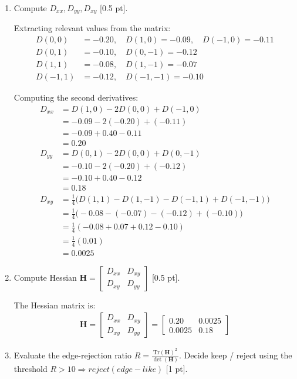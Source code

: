 \documentclass[12pt,a4paper]{article}
\begin{document}
\begin{enumerate}
    \item Compute $D_{xx}, D_{yy}, D_{xy}$ [0.5 pt].

    Extracting relevant values from the matrix:
    \begin{align*}
    D(0,0) &= -0.20, \quad D(1,0) = -0.09, \quad D(-1,0) = -0.11\\
    D(0,1) &= -0.10, \quad D(0,-1) = -0.12\\
    D(1,1) &= -0.08, \quad D(1,-1) = -0.07\\
    D(-1,1) &= -0.12, \quad D(-1,-1) = -0.10
    \end{align*}

    Computing the second derivatives:
    \begin{align*}
    D_{xx} &= D(1,0) - 2D(0,0) + D(-1,0)\\
    &= -0.09 - 2(-0.20) + (-0.11)\\
    &= -0.09 + 0.40 - 0.11\\
    &= 0.20\\[12pt]
    D_{yy} &= D(0,1) - 2D(0,0) + D(0,-1)\\
    &= -0.10 - 2(-0.20) + (-0.12)\\
    &= -0.10 + 0.40 - 0.12\\
    &= 0.18\\[12pt]
    D_{xy} &= \frac{1}{4}\big(D(1,1) - D(1,-1) - D(-1,1) + D(-1,-1)\big)\\
    &= \frac{1}{4}\big(-0.08 - (-0.07) - (-0.12) + (-0.10)\big)\\
    &= \frac{1}{4}(-0.08 + 0.07 + 0.12 - 0.10)\\
    &= \frac{1}{4}(0.01)\\
    &= 0.0025
    \end{align*}
    \item Compute Hessian $\mathbf H=\begin{bmatrix}D_{xx}&D_{xy}\\ D_{xy}&D_{yy}\end{bmatrix}$ [0.5 pt].
    
    The Hessian matrix is:
    \begin{align*}
    \mathbf{H} = \begin{bmatrix}
    D_{xx} & D_{xy}\\
    D_{xy} & D_{yy}
    \end{bmatrix} = \begin{bmatrix}
    0.20 & 0.0025\\
    0.0025 & 0.18
    \end{bmatrix}
    \end{align*}
    \item Evaluate the edge-rejection ratio $R=\frac{\mathrm{Tr}(\mathbf H)^2}{\det(\mathbf H)}$. Decide keep / reject using the threshold $R>10 \Rightarrow reject (edge-like)$ [1 pt].


\end{enumerate}
\end{document}
